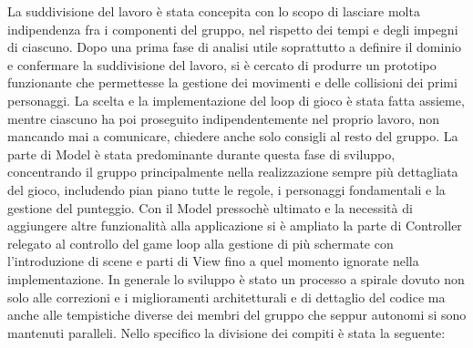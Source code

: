 \documentclass[a4paper,12pt, hidelinks]{report}
\begin{document}
La suddivisione del lavoro è stata concepita con lo scopo di lasciare molta indipendenza fra i componenti del gruppo, nel rispetto dei tempi e degli impegni di ciascuno. Dopo una prima fase di analisi utile soprattutto a definire il dominio e confermare la suddivisione del lavoro, si è cercato di produrre un prototipo funzionante che permettesse la gestione dei movimenti e delle collisioni dei primi personaggi. La scelta e la implementazione del loop di gioco è stata fatta assieme, mentre ciascuno ha poi proseguito indipendentemente nel proprio lavoro, non mancando mai a comunicare, chiedere anche solo consigli al resto del gruppo. La parte di Model è stata predominante durante questa fase di sviluppo, concentrando il gruppo principalmente nella realizzazione sempre più dettagliata del gioco, includendo pian piano tutte le regole, i personaggi fondamentali e la gestione del punteggio. Con il Model pressochè ultimato e la necessità di aggiungere altre funzionalità alla applicazione si è ampliato la parte di Controller relegato al controllo del game loop alla gestione di più schermate con l'introduzione di scene e parti di View fino a quel momento ignorate nella implementazione. In generale lo sviluppo è stato un processo a spirale dovuto non solo alle correzioni e i miglioramenti architetturali e di dettaglio del codice ma anche alle tempistiche diverse dei membri del gruppo che seppur autonomi si sono mantenuti paralleli.
Nello specifico la divisione dei compiti è stata la seguente:
\end{document}
